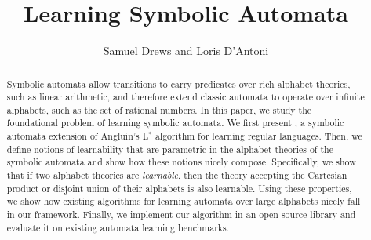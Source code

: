 \documentclass{llncs}
\begin{document}
\title{Learning Symbolic Automata}
\author{Samuel Drews and Loris D'Antoni}

\maketitle
\begin{abstract}
Symbolic  automata allow transitions to carry predicates over
rich alphabet theories, such as linear arithmetic, and therefore extend
classic automata to operate over infinite alphabets, such as
the set of rational numbers. 
In this paper, we study the foundational problem of learning symbolic automata.
We first present \alg,
a symbolic automata extension of Angluin's L$^*$
algorithm for learning regular languages.
Then, we define notions of learnability that are parametric in the alphabet theories
of the symbolic automata and show how these notions nicely compose.
Specifically, we show that if two alphabet theories are \emph{learnable},
then the theory accepting the Cartesian product or disjoint union of their alphabets is also learnable.
Using these properties, we show
how existing algorithms for learning automata over large alphabets nicely fall in our framework.
Finally, we implement our algorithm in an open-source library and evaluate it on existing automata learning benchmarks.
\end{abstract}












\end{document}
